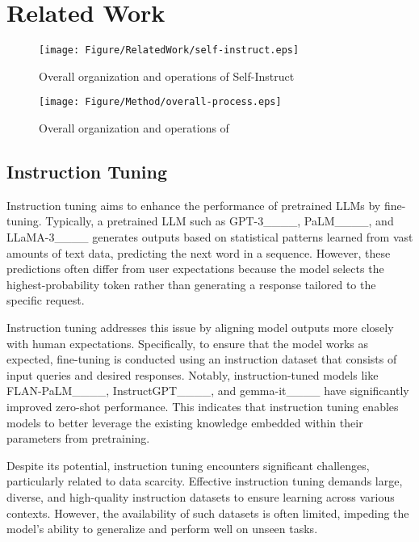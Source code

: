 \section{Related Work}
\label{sec:relatedwork}

\begin{figure}[b]
    \centering
    \texttt{[image: Figure/RelatedWork/self-instruct.eps]}
    \caption{Overall organization and operations of Self-Instruct}
    \label{fig:self-instruct}
\end{figure}

\begin{figure*}[t!]%
	\centering
	\texttt{[image: Figure/Method/overall-process.eps]}
	\caption{Overall organization and operations of \ours{}}%
	\label{fig:sedi-instruct}%
\end{figure*}
\subsection{Instruction Tuning}
Instruction tuning aims to enhance the performance of pretrained LLMs by
fine-tuning. Typically, a pretrained LLM such as GPT-3____,
PaLM____, and LLaMA-3____ generates outputs based
on statistical patterns learned from vast amounts of text data, predicting the
next word in a sequence. However, these predictions often differ from user
expectations because the model selects the highest-probability token rather than
generating a response tailored to the specific request.







Instruction tuning addresses this issue by aligning model outputs more closely
with human expectations. Specifically, to ensure that the model works as
expected, 
fine-tuning is conducted using 
an instruction dataset that consists of input queries and desired responses.
Notably, instruction-tuned models like FLAN-PaLM____,
InstructGPT____, and gemma-it____ have significantly
improved zero-shot performance. This indicates that instruction tuning enables
models to better leverage the existing knowledge embedded within their parameters
from pretraining.



Despite its potential, instruction tuning encounters significant challenges,
particularly related to data scarcity. Effective instruction tuning demands
large, diverse, and high-quality instruction datasets to ensure learning across
various contexts. However, the availability of such datasets is often limited,
impeding the model's ability to generalize and perform well on unseen tasks.


